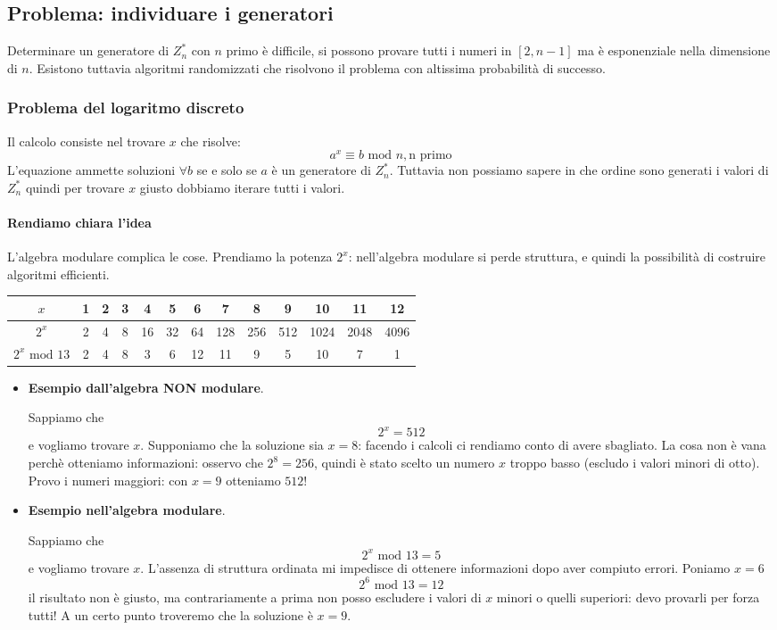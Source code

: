 \subsection{Problema: individuare i generatori}
Determinare un generatore di $Z_n^*$ con $n$ primo è difficile, si possono provare tutti i numeri in $[2, n-1]$ ma è esponenziale nella dimensione di $n$. Esistono tuttavia algoritmi randomizzati che risolvono il problema con altissima probabilità di successo.

\subsubsection{Problema del logaritmo discreto}
Il calcolo consiste nel trovare $x$ che risolve:
$$ a^x \equiv b \text{ mod } n, \text{n primo} $$
L'equazione ammette soluzioni $\forall b$ se e solo se $a$ è un generatore di $Z_n^*$. Tuttavia non possiamo sapere in che ordine sono generati i valori di $Z_n^*$ quindi per trovare $x$ giusto dobbiamo iterare tutti i valori. 

\paragraph{Rendiamo chiara l'idea} L'algebra modulare complica le cose. Prendiamo la potenza $2^x$: nell'algebra modulare si perde struttura, e quindi la possibilità di costruire algoritmi efficienti.
\begin{table}[ht!]
	\centering
	\small
	\begin{tabular}{c|c c c c c c c c c c c c}
		$x$ & 1 & 2 & 3 & 4 & 5 & 6 & 7 & 8 & 9 & 10 & 11 & 12  \\
		\hline
		$2^{x}$ & 2 & 4 & 8 & 16 & 32 & 64 & 128 & 256 & 512 & 1024 & 2048 & 4096  \\
		$2^{x} \text{ mod } 13$ & 2 & 4 & 8 & 3 & 6 & 12 & 11 & 9 & 5 & 10 & 7 & 1  \\
	\end{tabular}
\end{table}
\begin{itemize}
	\item \textbf{Esempio dall'algebra NON modulare}.
	
	Sappiamo che
	$$2^x=512$$
	e vogliamo trovare $x$. Supponiamo che la soluzione sia $x=8$: facendo i calcoli ci rendiamo conto di avere sbagliato. La cosa non è vana perchè otteniamo informazioni: osservo che $2^8 = 256$, quindi è stato scelto un numero $x$ troppo basso (escludo i valori minori di otto). Provo i numeri maggiori: con $x=9$ otteniamo $512$!
	
	\item \textbf{Esempio nell'algebra modulare}.
	
	Sappiamo che
	$$2^x \text{ mod } 13 = 5$$
	e vogliamo trovare $x$. L'assenza di struttura ordinata mi impedisce di ottenere informazioni dopo aver compiuto errori. Poniamo $x=6$
	$$2^6 \text{ mod } 13 = 12$$
	il risultato non è giusto, ma contrariamente a prima non posso escludere i valori di $x$ minori o quelli superiori: devo provarli per forza tutti! A un certo punto troveremo che la soluzione è $x=9$.
	
\end{itemize}

